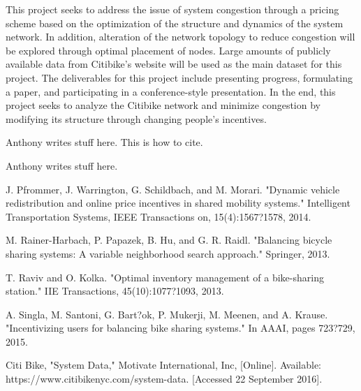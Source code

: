 \documentclass[times, 10pt,twocolumn]{article}
\begin{document}
This project seeks to address the issue of system congestion through a pricing scheme based on the optimization of the structure and dynamics of the system network. In addition, alteration of the network topology to reduce congestion will be explored through optimal placement of nodes. Large amounts of publicly available data from Citibike's website will be used as the main dataset for this project. The deliverables for this project include presenting progress, formulating a paper, and participating in a conference-style presentation. In the end, this project seeks to analyze the Citibike network and minimize congestion by modifying its structure through changing people's incentives.


Anthony writes stuff here. This is how to cite. \cite{redistribution} %


Anthony writes stuff here.

\nocite{ex1,ex2}



\begin{thebibliography}{}

J. Pfrommer, J. Warrington, G. Schildbach, and M. Morari. "Dynamic vehicle redistribution and online price incentives in shared mobility systems." Intelligent Transportation Systems, IEEE Transactions on, 15(4):1567?1578, 2014.

M. Rainer-Harbach, P. Papazek, B. Hu, and G. R. Raidl. "Balancing bicycle sharing systems: A variable neighborhood search approach." Springer, 2013.

T. Raviv and O. Kolka. "Optimal inventory management of a bike-sharing station." IIE Transactions, 45(10):1077?1093, 2013.

A. Singla, M. Santoni, G. Bart?ok, P. Mukerji, M. Meenen, and A. Krause. "Incentivizing users for balancing bike sharing systems." In AAAI, pages 723?729, 2015.

Citi Bike, "System Data," Motivate International, Inc, [Online]. Available: https://www.citibikenyc.com/system-data. [Accessed 22 September 2016].

\end{thebibliography}
\end{document}

